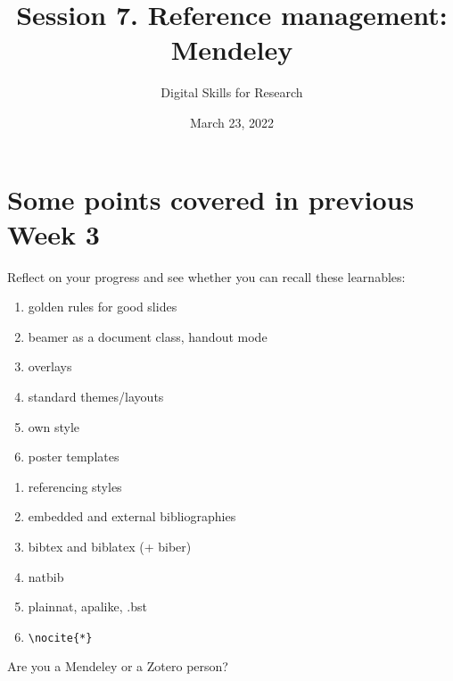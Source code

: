\documentclass[a4paper,11pt]{article}
\title{Session 7. Reference management: Mendeley}
\author{Digital Skills for Research}
\date{March 23, 2022}
\begin{document}
\maketitle
\tableofcontents

\section*{Some points covered in previous Week 3}

Reflect on your progress and see whether you can recall these learnables:

\bigskip

\begin{tcolorbox}[width=.475\textwidth, nobeforeafter,height=6.5cm,valign=center, fonttitle=\bfseries,title=Session 5]
	\begin{enumerate}
		\item golden rules for good slides
		\item beamer as a document class, handout mode
		\item overlays
		\item standard themes/layouts
		\item own style
		\item poster templates

	\end{enumerate}
\end{tcolorbox}\hfill
%
\begin{tcolorbox}[width=.475\textwidth, nobeforeafter,height=6.5cm,valign=center,fonttitle=\bfseries,title=Session 6]
	\begin{enumerate}
		\item referencing styles
		\item embedded and external bibliographies
		\item bibtex and biblatex (+ biber)
		\item natbib 
		\item plainnat, apalike, .bst
		\item \verb|\nocite{*}|
	\end{enumerate}
\end{tcolorbox}

\bigskip

\begin{tcolorbox}[colback=red!5!white, colframe=red!75!black]
	\centering
	{\Large{Are you a Mendeley or a Zotero person?}}
\end{tcolorbox}
\end{document}
